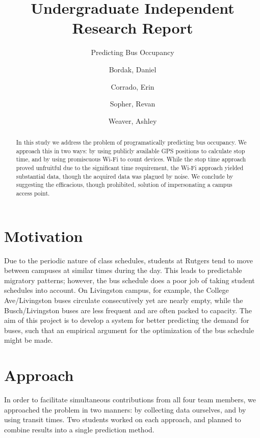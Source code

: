 \documentclass[letterpaper,abstract=on,titlepage=false]{scrreprt}
\begin{document}
\title{Undergraduate Independent Research Report}
\subtitle{Predicting Bus Occupancy}
\author{
Bordak, Daniel
\and
Corrado, Erin
\and
Sopher, Revan
\and
Weaver, Ashley
}

\maketitle

\begin{abstract}
In this study we address the problem of programatically predicting bus occupancy.
We approach this in two ways: by using publicly available GPS positions to calculate stop time, and by using promiscuous Wi-Fi to count devices.
While the stop time approach proved unfruitful due to the significant time requirement, the Wi-Fi approach yielded substantial data, though the acquired data was plagued by noise.
We conclude by suggesting the efficacious, though prohibited, solution of impersonating a campus access point.
\end{abstract}

\section*{Motivation}

Due to the periodic nature of class schedules, students at Rutgers tend to move between campuses at similar times during the day.
This leads to predictable migratory patterns; however, the bus schedule does a poor job of taking student schedules into account. On Livingston campus, for example, the College Ave/Livingston buses circulate consecutively yet are nearly empty, while the Busch/Livingston buses are less frequent and are often packed to capacity.
The aim of this project is to develop a system for better predicting the demand for buses, such that an empirical argument for the optimization of the bus schedule might be made.

\section*{Approach}

In order to facilitate simultaneous contributions from all four team members, we approached the problem in two manners: by collecting data ourselves, and by using transit times.
Two students worked on each approach, and planned to combine results into a single prediction method.
\end{document}
